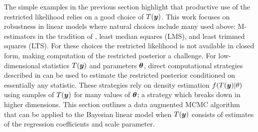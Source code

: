 \documentclass[ba]{imsart}
\def\bth{\mbox{\boldmath $\theta$}}
\newcommand{\by}{\mbox{\boldmath $y$}}
\begin{document}
The simple examples in the previous section highlight that productive use of the restricted likelihood relies on a good choice of $T(\by)$. This work focuses on robustness in linear models where natural choices include many used above:  M-estimators in the tradition of \cite{huber1964}, least median squares (LMS), and least trimmed squares (LTS). For these choices the restricted likelihood is not available in closed form, making computation of the restricted posterior a challenge. For low-dimensional statistics $T(\by)$ and parameters $\bth$, direct computational strategies described in \cite{lewis2014} can be used to estimate the restricted posterior conditioned on essentially any statistic.  These strategies rely on density estimation $f(T(\by)|\theta)$ using samples of $T(\by)$ for many values of $\bth$; a strategy which breaks down in higher dimensions. This section outlines a data augmented MCMC algorithm that can be applied to the Bayesian linear model when $T(\by)$ consists of estimates of the regression coefficients and scale parameter. 
\end{document}
